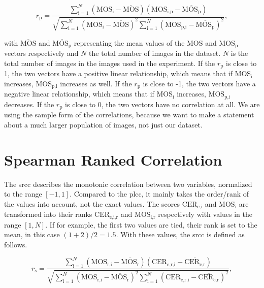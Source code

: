 \begin{equation}
    r_{\text{p}} = \frac{\sum_{\text{i}=1}^{N}{(\text{MOS}_{\text{i}}-\overline{\text{MOS}})(\text{MOS}_{\text{i,p}}-\overline{\text{MOS}_{\text{p}}})}}{\sqrt{\sum_{\text{i}=1}^{N}{(\text{MOS}_{\text{i}}-\overline{\text{MOS}})^2}\sum_{\text{i}=1}^{N}{(\text{MOS}_{\text{p,i}}-\overline{\text{MOS}_{\text{p}}})^2}}},
    \label{eq:pearson}
\end{equation}

with $\overline{\text{MOS}}$ and $\overline{\text{MOS}_{\text{p}}}$ representing the mean values of the $\text{MOS}$ and $\text{MOS}_{\text{p}}$ vectors respectively and $N$ the total number of images in the dataset.
$N$ is the total number of images in the images used in the experiment.
If the $r_{\text{p}}$ is close to 1, the two vectors have a positive linear relationship, which means that if $\text{MOS}_{\text{i}}$ increases, $\text{MOS}_{\text{p,i}}$ increases as well.
If the $r_{\text{p}}$ is close to -1, the two vectors have a negative linear relationship, which means that if $\text{MOS}_{\text{i}}$ increases, $\text{MOS}_{\text{p,i}}$ decreases.
If the $r_{\text{p}}$ is close to 0, the two vectors have no correlation at all.
We are using the sample form of the correlations, because we want to make a statement about a much larger population of images, not just our dataset.

\section{Spearman Ranked Correlation}
\label{sec:spearman}

The \gls{srcc} \cite{pears_spear_2016} describes the monotonic correlation between two variables, normalized to the range $[-1, 1]$.
Compared to the \gls{plcc}, it mainly takes the order/rank of the values into account, not the exact values.
The scores $\text{CER}_{\text{c,i}}$ and $\text{MOS}_{\text{i}}$ are transformed into their ranks $\text{CER}_{\text{c,i,r}}$ and $\text{MOS}_{\text{i,r}}$ respectively with values in the range $[1, N]$.
If for example, the first two values are tied, their rank is set to the mean, in this case $(1+2)/2 = 1.5$.
With these values, the \gls{srcc} is defined as follows.

\begin{equation}
    r_{\text{s}} = \frac{\sum_{\text{i}=1}^{N}{(\text{MOS}_{\text{r,i}}-\overline{\text{MOS}_{\text{r}}})(\text{CER}_{\text{c,r,i}}-\overline{\text{CER}_{\text{c,r}}})}}{\sqrt{\sum_{\text{i}=1}^{N}{(\text{MOS}_{\text{r,i}}-\overline{\text{MOS}_{\text{r}}})^2}\sum_{\text{i}=1}^{N}{(\text{CER}_{\text{c,r,i}}-\overline{\text{CER}_{\text{c,r}}})^2}}},
    \label{eq:spearman}
\end{equation}


